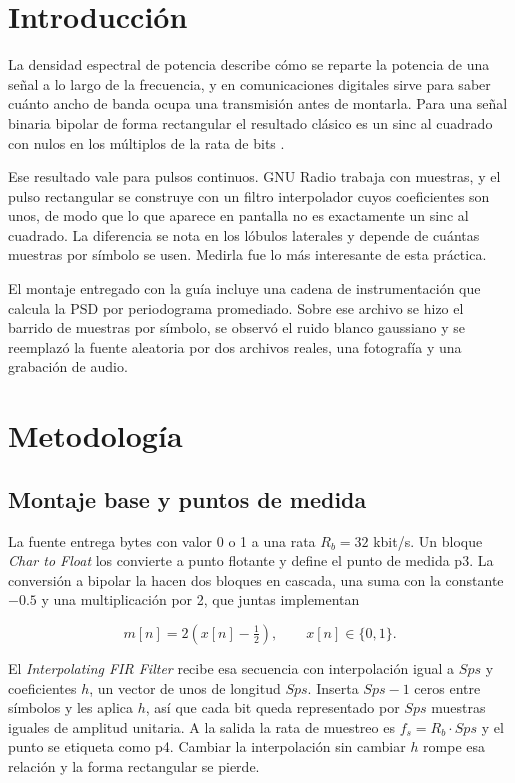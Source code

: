 \documentclass[twocolumn]{IEEEtran}
\begin{document}
\section{Introducción}

La densidad espectral de potencia describe cómo se reparte la potencia de una señal a lo largo de la frecuencia, y en comunicaciones digitales sirve para saber cuánto ancho de banda ocupa una transmisión antes de montarla. Para una señal binaria bipolar de forma rectangular el resultado clásico es un sinc al cuadrado con nulos en los múltiplos de la rata de bits \cite{b1}.

Ese resultado vale para pulsos continuos. GNU Radio trabaja con muestras, y el pulso rectangular se construye con un filtro interpolador cuyos coeficientes son unos, de modo que lo que aparece en pantalla no es exactamente un sinc al cuadrado. La diferencia se nota en los lóbulos laterales y depende de cuántas muestras por símbolo se usen. Medirla fue lo más interesante de esta práctica.

El montaje entregado con la guía \cite{b4} incluye una cadena de instrumentación que calcula la PSD por periodograma promediado. Sobre ese archivo se hizo el barrido de muestras por símbolo, se observó el ruido blanco gaussiano y se reemplazó la fuente aleatoria por dos archivos reales, una fotografía y una grabación de audio.

\section{Metodología}

\subsection{Montaje base y puntos de medida}

La fuente entrega bytes con valor 0 o 1 a una rata $R_b = 32$ kbit/s. Un bloque \textit{Char to Float} los convierte a punto flotante y define el punto de medida p3. La conversión a bipolar la hacen dos bloques en cascada, una suma con la constante $-0.5$ y una multiplicación por 2, que juntas implementan

\begin{equation}
    m[n] = 2\left(x[n] - \tfrac{1}{2}\right), \qquad x[n] \in \{0,1\}.
    \label{eq:bipolar}
\end{equation}

El \textit{Interpolating FIR Filter} recibe esa secuencia con interpolación igual a $Sps$ y coeficientes $h$, un vector de unos de longitud $Sps$. Inserta $Sps-1$ ceros entre símbolos y les aplica $h$, así que cada bit queda representado por $Sps$ muestras iguales de amplitud unitaria. A la salida la rata de muestreo es $f_s = R_b \cdot Sps$ y el punto se etiqueta como p4. Cambiar la interpolación sin cambiar $h$ rompe esa relación y la forma rectangular se pierde.
\end{document}
